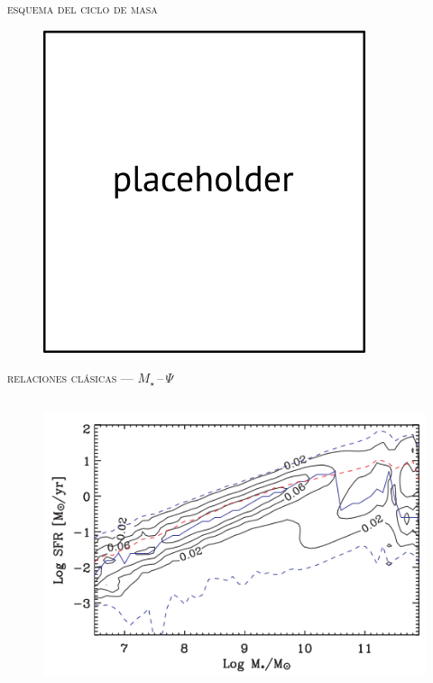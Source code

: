 \documentclass[xcolor=dvipsnames,4pt,hyperref={colorlinks,citecolor=black,linkcolor=black,urlcolor=black}]{beamer}
\begin{document}
\begin{frame}{\textsc{esquema del ciclo de masa}}
\begin{figure}
\includegraphics[scale=1]{img/placeholder}
\end{figure}
\end{frame}

\begin{frame}{\textsc{relaciones clásicas --- $M_\star\,$--$\,\Psi$}}

\begin{columns}
\begin{figure}
\includegraphics[scale=1]{img/brinchmann2004-17}
\end{figure}
\end{columns}
\end{frame}
\end{document}
